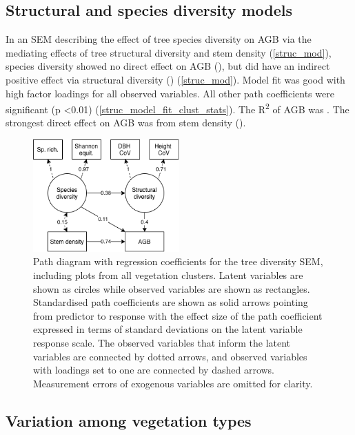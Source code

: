 \documentclass[11pt,a4paper]{article}
\begin{document}
\subsection{Structural and species diversity models}

In an SEM describing the effect of tree species diversity on AGB via the mediating effects of tree structural diversity and stem density (\autoref{struc_mod}), species diversity showed no direct effect on AGB (\strucbetadb{}), but did have an indirect positive effect via structural diversity (\strucbetadib{}) (\autoref{struc_mod}). Model fit was good with high factor loadings for all observed variables. All other path coefficients were significant (p <0.01) (\autoref{struc_model_fit_clust_stats}). The R\textsuperscript{2} of AGB was \strucrsq{}. The strongest direct effect on AGB was from stem density (\strucbetaib{}).

\begin{figure}[H]
\centering
	\includegraphics[width=0.5\textwidth]{struc}
	\caption{Path diagram with regression coefficients for the tree diversity SEM, including plots from all vegetation clusters. Latent variables are shown as circles while observed variables are shown as rectangles. Standardised path coefficients are shown as solid arrows pointing from predictor to response with the effect size of the path coefficient expressed in terms of standard deviations on the latent variable response scale. The observed variables that inform the latent variables are connected by dotted arrows, and observed variables with loadings set to one are connected by dashed arrows. Measurement errors of exogenous variables are omitted for clarity.}
	\label{struc_mod}
\end{figure}

\subsection{Variation among vegetation types}
\end{document}
